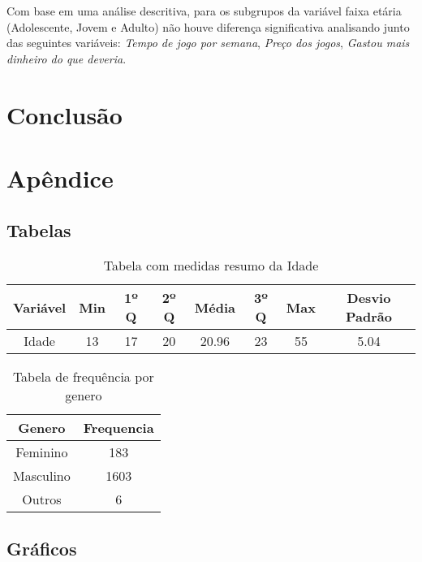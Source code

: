 \documentclass[11pt,a4paper]{article}
\begin{document}
Com base em uma análise descritiva, para os subgrupos da variável faixa etária (Adolescente, Jovem e Adulto) não houve diferença significativa analisando junto das seguintes variáveis: \textit{Tempo de jogo por semana}, \textit{Preço dos jogos}, \textit{Gastou mais dinheiro do que deveria}.
 
 
\section{Conclusão}
\indent

\section{Apêndice}
\subsection{Tabelas}

\begin{table}[h!]
  \begin{center}
    \begin{tabular}{c|c|c|c|c|c|c|c}
    \hline
      \textbf{Variável} & \textbf{Min} &  \textbf{1º Q} &\textbf{2º Q} &  \textbf{Média}  & \textbf{3º Q} & \textbf{Max}  & \textbf{Desvio Padrão} \\
      \hline
      Idade & 13 & 17 & 20 & 20.96 & 23 & 55 & 5.04\\
      \hline
    \end{tabular}
    \caption{Tabela com medidas resumo da Idade}
     \label{table:1}
  \end{center}
\end{table}

\begin{table}[h!]
 \begin{center}
\begin{tabular}{c|c}
\hline
Genero & Frequencia\\
\hline
Feminino & 183\\
\hline
Masculino & 1603\\
\hline
Outros & 6\\
\hline
\end{tabular}
    \caption{Tabela de frequência por genero}
     \label{table:2}
  \end{center}
\end{table}

\subsection{Gráficos}
\end{document}

